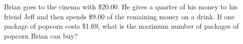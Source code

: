 Brian goes to the cinema with \$20.00. He gives a quarter of his money to his friend Jeff and then spends \$9.00 of the remaining money on a drink. If one package of popcorn costs \$1.69, what is the maximum number of packages of popcorn Brian can buy?
